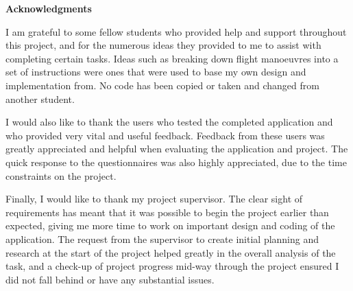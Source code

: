\thispagestyle{empty}

\begin{center}
    {\LARGE\bf Acknowledgments}
\end{center}

I am grateful to some fellow students who provided help and support throughout this project, and for the numerous ideas they provided to me to assist with completing certain tasks. Ideas such as breaking down flight manoeuvres into a set of instructions were ones that were used to base my own design and implementation from. No code has been copied or taken and changed from another student. 

I would also like to thank the users who tested the completed application and who provided very vital and useful feedback. Feedback from these users was greatly appreciated and helpful when evaluating the application and project. The quick response to the questionnaires was also highly appreciated, due to the time constraints on the project.

Finally, I would like to thank my project supervisor. The clear sight of requirements has meant that it was possible to begin the project earlier than expected, giving me more time to work on important design and coding of the application. The request from the supervisor to create initial planning and research at the start of the project helped greatly in the overall analysis of the task, and a check-up of project progress mid-way through the project ensured I did not fall behind or have any substantial issues.